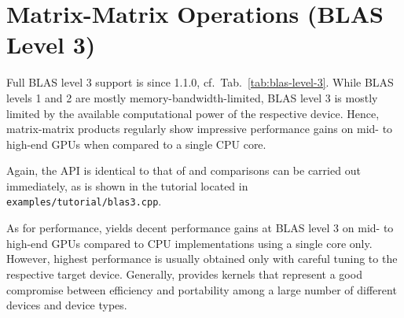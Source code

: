 \section{Matrix-Matrix Operations (BLAS Level 3)}
Full BLAS level 3 support is since {\ViennaCL} 1.1.0, cf.~Tab.~\ref{tab:blas-level-3}. While BLAS
levels 1 and 2 are mostly memory-bandwidth-limited, BLAS level 3 is mostly
limited by the available computational power of the respective device. Hence,
matrix-matrix products regularly show impressive performance gains on mid-
to high-end GPUs when compared to a single CPU core.

Again, the {\ViennaCL} API is identical to that of {\ublas} and comparisons can
be carried out immediately, as is shown in the tutorial located in
\texttt{examples/tutorial/blas3.cpp}.

As for performance, {\ViennaCL} yields decent performance gains at BLAS level
3 on mid- to high-end GPUs compared to CPU implementations using a single core
only. However, highest performance is usually obtained only with careful tuning to the respective target device.
Generally, {\ViennaCL} provides
kernels that represent a good compromise between efficiency and portability
among a large number of different devices and device types.


